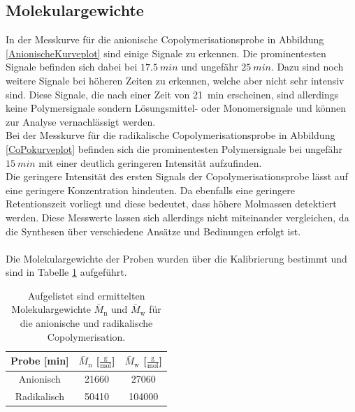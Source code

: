 \documentclass[10pt,a4paper,ngerman]{scrartcl}
\begin{document}
	\subsection{Molekulargewichte}

		In der Messkurve für die anionische Copolymerisationsprobe in Abbildung \ref{AnionischeKurveplot} sind einige Signale zu erkennen. Die 
		prominentesten Signale befinden sich dabei bei $\SI{17,5}{min}$ und ungefähr $\SI{25}{min}$. Dazu sind noch weitere Signale bei höheren 
		Zeiten zu erkennen, welche aber nicht sehr intensiv sind. Diese Signale, die nach einer Zeit von \SI{21}{min} erscheinen, sind allerdings 
		keine Polymersignale sondern Lösungsmittel- oder Monomersignale und können zur Analyse vernachlässigt werden. \\
		Bei der Messkurve für die radikalische Copolymerisationsprobe in Abbildung \ref{CoPokurveplot} befinden sich die prominentesten Polymersignale bei ungefähr 
		$\SI{15}{min}$ mit einer deutlich geringeren Intensität aufzufinden. \\
		Die geringere Intensität des ersten Signals der Copolymerisationsprobe lässt auf eine geringere Konzentration hindeuten. Da ebenfalls 
		eine geringere Retentionszeit vorliegt und diese bedeutet, dass höhere Molmassen detektiert werden. Diese Messwerte lassen sich allerdings nicht 
		miteinander vergleichen, da die Synthesen über verschiedene Ansätze und Bedinungen erfolgt ist. \\\\

		Die Molekulargewichte der Proben wurden über die Kalibrierung bestimmt und sind in Tabelle \ref{Molekulargewichteanionischradikalisch} aufgeführt.

		\begin{table}[H]
    	\begin{center}
        	\caption{Aufgelistet sind ermittelten Molekulargewichte $\bar{M}_\text{n}$ und $\bar{M}_\text{w}$ für die anionische und radikalische Copolymerisation.}
        	\label{Molekulargewichteanionischradikalisch}
            	\begin{tabular}{c|c|c}
					\hline
					Probe [min]& $\bar{M}_\text{n}$ [$\frac{\text{g}}{\text{mol}}$] & $\bar{M}_\text{w}$ [$\frac{\text{g}}{\text{mol}}$]\\
					\hline  
					Anionisch	& 21660	& 27060	 \\
					Radikalisch	& 50410	& 104000	 \\
				\end{tabular}
		\end{center}
		\end{table}
\end{document}
